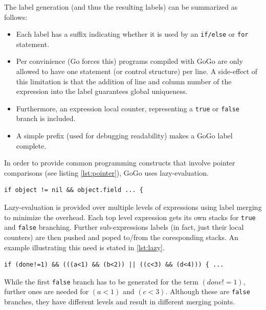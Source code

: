 \documentclass[a4paper]{scrartcl}
\begin{document}
      The label generation (and thus the resulting labels) can be summarized as 
      follows:
      \begin{itemize}
        \item Each label has a suffix indicating whether it is used by an 
          \texttt{if/else} or \texttt{for} statement.
        \item Per convinience (Go forces this) programs compiled with GoGo
          are only allowed to have one statement (or control structure) per 
          line. A side-effect of this limitation is that the addition of line
          and column number of the expression into the label guarantees global
          uniqueness.
        \item Furthermore, an expression local counter, representing a \texttt{true} 
          or \texttt{false} branch is included.
        \item A simple prefix (used for debugging readability) makes a GoGo
          label complete.
      \end{itemize}

      In order to provide common programming constructs that involve pointer 
      comparisons (see listing \ref{lst:pointer}), GoGo uses lazy-evaluation.

      \begin{lstlisting}[label=lst:pointer,caption=Pointer comparison]
if object != nil && object.field ... {
      \end{lstlisting}

      Lazy-evaluation is provided over multiple levels of expressions using
      label merging to minimize the overhead. Each top level expression gets 
      its own stacks for \texttt{true} and \texttt{false} branching. Further 
      sub-expressions labels (in fact, just their local counters) are then 
      pushed and poped to/from the coresponding stacks. An example illustrating 
      this need is stated in \ref{lst:lazy}.
      \begin{lstlisting}[caption=Lazy-evaluation over multiple expression levels, label=lst:lazy]
if (done!=1) && (((a<1) && (b<2)) || ((c<3) && (d<4))) { ...
      \end{lstlisting}
      While the first \texttt{false} branch has to be generated for the term
      $(done!=1)$, further ones are needed for $(a<1)$ and $(c<3)$. Although these are
      \texttt{false} branches, they have different levels and result in different
      merging points.
\end{document}
